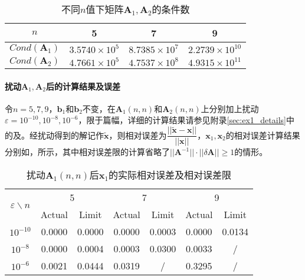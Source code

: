 \documentclass[12pt,a4paper]{article}
\begin{document}
\begin{table}
    \centering
    \caption{不同$n$值下矩阵$\boldsymbol{A}_1,\boldsymbol{A}_2$的条件数}
    \label{tab:ex1_cond}
    \begin{tabular}{c|ccc}
        \toprule
        $n$ & 5 & 7 & 9\tabularnewline
        \midrule
        $Cond(\boldsymbol{A}_1)$ & $3.5740\times 10^{5}$ & $8.7385\times10^{7}$ & $2.2739\times{10}^{10}$ \tabularnewline
        $Cond(\boldsymbol{A}_2)$ & $4.7661\times 10^{5}$ & $4.7537\times10^{8}$ & $4.9315\times{10}^{11}$ \tabularnewline
        \bottomrule
    \end{tabular}
\end{table}

\paragraph{扰动$\boldsymbol{A}_1,\boldsymbol{A}_2$后的计算结果及误差} 令$n=5,7,9$，$\boldsymbol{b}_1$和$\boldsymbol{b}_2$不变，在$\boldsymbol{A}_1(n,n)$和$\boldsymbol{A}_2(n,n)$上分别加上扰动$\varepsilon=10^{-10},10^{-8},10^{-6}$，限于篇幅，详细的计算结果请参见附录\ref{sec:ex1_details}中的及。经扰动得到的解记作$\tilde{\boldsymbol{x}}$，则相对误差为$\dfrac{||\tilde{\boldsymbol{x}} - \boldsymbol{x}||}{||\boldsymbol{x}||}$，$\boldsymbol{x}_1,\boldsymbol{x}_2$的相对误差计算结果分别如，所示，其中相对误差限的计算省略了$||\boldsymbol{A}^{-1}||\cdot||\delta\boldsymbol{A}|| \ge 1$的情形。

\begin{table}
    \centering
    \caption{扰动$\boldsymbol{A}_1(n,n)$后$\boldsymbol{x}_1$的实际相对误差及相对误差限}
    \label{tab:ex1_err1}
    \begin{tabular}{c|cc|cc|cc}
        \toprule
        \multirow{2}{*}{\(\varepsilon \backslash n\)} & \multicolumn{2}{c}{5} & \multicolumn{2}{|c}{7} & \multicolumn{2}{|c}{9}\tabularnewline
        \cline{2-7}
        & Actual & Limit & Actual & Limit & Actual & Limit\tabularnewline
        \midrule
        \(10^{-10}\) & 0.0000 & 0.0000 & 0.0000 & 0.0003 & 0.0000 &
        0.0134\tabularnewline
        \(10^{-8}\) & 0.0000 & 0.0004 & 0.0003 & 0.0300 & 0.0033 &
        /\tabularnewline
        \(10^{-6}\) & 0.0021 & 0.0444 & 0.0319 & / & 0.3295 & /\tabularnewline
        \bottomrule
    \end{tabular}
\end{table}
\end{document}
